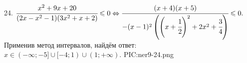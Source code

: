 24. $\cfrac{x^2+9x+20}{(2x-x^2-1)(3x^2+x+2)}\leqslant0\Leftrightarrow \cfrac{(x+4)(x+5)}{-(x-1)^2\left(\left(x+\cfrac{1}{2}\right)^2+2x^2+\cfrac{3}{4}\right)}\leqslant0.$ Применив метод интервалов, найдём ответ: $x\in
(-\infty;-5]\cup[-4;1)\cup(1;+\infty).$
{{PIC:ner9-24.png}}\newpage\noindent
